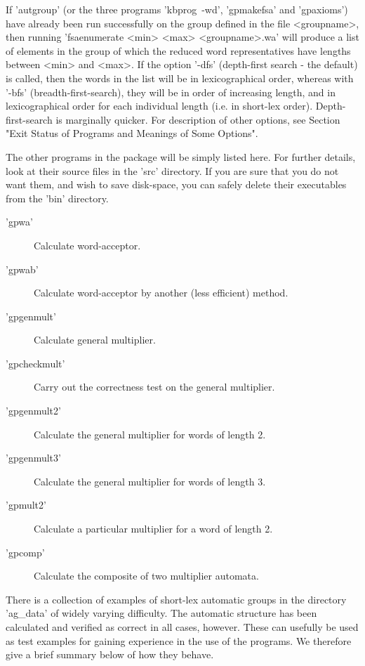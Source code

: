 If 'autgroup' (or the three programs 'kbprog\ -wd', 'gpmakefsa'
and 'gpaxioms') have already been run successfully on the group defined
in the file <groupname>,
then running 'fsaenumerate <min> <max> <groupname>.wa'
will produce a list of elements in the group of which the reduced
word representatives have lengths between <min> and <max>.
If the option '-dfs' (depth-first search - the default) is called,
then the words
in the list will be in lexicographical order, whereas with '-bfs'
(breadth-first-search), they will be in order of increasing length, and in
lexicographical order for each individual length (i.e. in short-lex order).
Depth-first-search is marginally quicker.
For description of other options, see Section
"Exit Status of Programs and Meanings of Some Options".


The other programs in the package will be simply listed here. For
further details, look at their source files in the 'src' directory.
If you are sure that you do not want them, and wish to save disk-space,
you can safely delete their executables from the 'bin' directory.
\begin{description}
\item['gpwa'] Calculate word-acceptor.
\item['gpwab'] Calculate word-acceptor by another (less efficient) method.
\item['gpgenmult'] Calculate general multiplier.
\item['gpcheckmult'] Carry out the correctness test on the general multiplier.
\item['gpgenmult2'] Calculate the general multiplier for words of length 2.
\item['gpgenmult3'] Calculate the general multiplier for words of length 3.
\item['gpmult2'] Calculate a particular multiplier for a word of length 2.
\item['gpcomp'] Calculate the composite of two multiplier automata.
\end{description}


There is a collection of examples of short-lex automatic groups in the
directory 'ag\_data' of widely varying difficulty. The automatic structure
has been calculated and verified as correct in all cases, however.
These can usefully be used as test examples for gaining experience in the
use of the programs. We therefore give a brief summary below of how
they behave.


